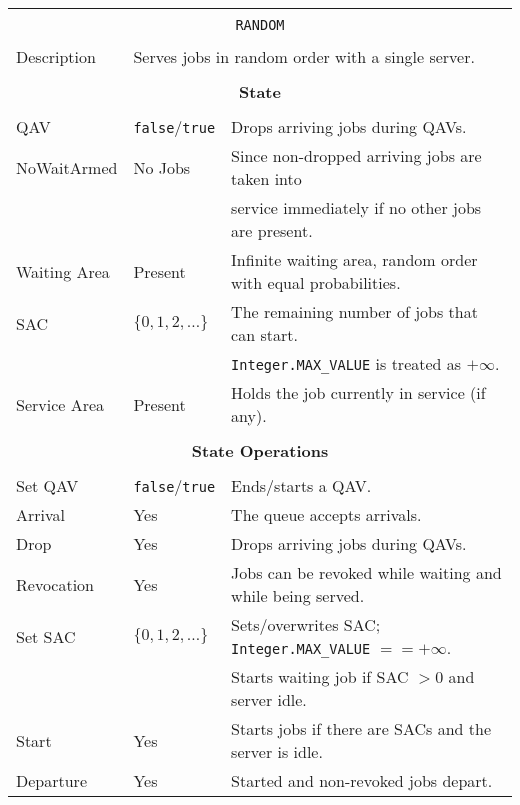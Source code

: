 \documentclass[12pt]{book}
\begin{document}
\begin{tabular}{|l|l|l|}
\hline
\multicolumn{3}{|c|}{} \\
\multicolumn{3}{|c|}{\lstinline[basicstyle=\large]{RANDOM}} \\
\multicolumn{3}{|c|}{} \\
\hline
Description & \multicolumn{2}{|l|}{Serves jobs in random order with a single server.} \\
\hline
\multicolumn{3}{|c|}{} \\
\multicolumn{3}{|c|}{\bf State} \\
\multicolumn{3}{|c|}{} \\
\hline
QAV & \lstinline|false|/\lstinline|true| & Drops arriving jobs during QAVs. \\
\hline
NoWaitArmed & No Jobs & Since non-dropped arriving jobs are taken into \\
            &         & service immediately if no other jobs are present. \\
\hline
Waiting Area & Present & Infinite waiting area, random order with equal probabilities. \\
\hline
SAC & $\{0, 1, 2, \ldots\}$ & The remaining number of jobs that can start. \\
    &                       & \lstinline|Integer.MAX_VALUE| is treated as $+\infty$. \\
\hline
Service Area & Present & Holds the job currently in service (if any). \\
\hline
\multicolumn{3}{|c|}{} \\
\multicolumn{3}{|c|}{\bf State Operations} \\
\multicolumn{3}{|c|}{} \\
\hline
Set QAV & \lstinline|false|/\lstinline|true| & Ends/starts a QAV. \\
\hline
Arrival & Yes & The queue accepts arrivals. \\
\hline
Drop & Yes & Drops arriving jobs during QAVs. \\
\hline
Revocation & Yes & Jobs can be revoked while waiting and while being served. \\
\hline
Set SAC & $\{0, 1, 2, \ldots\}$ & Sets/overwrites SAC; \lstinline|Integer.MAX_VALUE| $== +\infty$. \\
        &                       & Starts waiting job if SAC $> 0$ and server idle. \\
\hline
Start & Yes & Starts jobs if there are SACs and the server is idle. \\
\hline
Departure & Yes & Started and non-revoked jobs depart. \\

\end{tabular}
\end{document}
